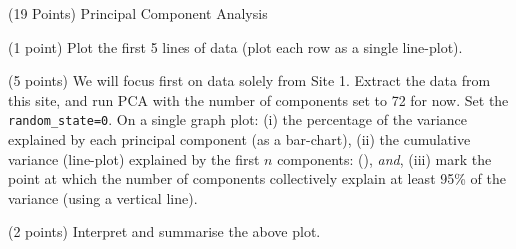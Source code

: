\documentclass[12pt]{article}
\begin{document}
\begin{question}{(19 Points) Principal Component Analysis}
\begin{subquestion}{(1 point) Plot the first 5 lines of data (plot each row as a single line-plot).}
\end{subquestion}



\begin{subquestion}{(5 points) We will focus first on data solely from Site 1. Extract the data from this site, and run PCA with the number of components set to 72 for now. Set the \texttt{random\_state=0}. On a single graph plot: (i) the percentage of the variance explained by each principal component (as a bar-chart), (ii) the cumulative variance (line-plot) explained by the first $n$ components: (), \textsl{and}, (iii) mark the point at which the number of components collectively explain at least 95\% of the variance (using a vertical line). }






\end{subquestion}

\begin{subquestion}{(2 points) Interpret and summarise the above plot.}







\end{subquestion}
\end{question}
\end{document}
